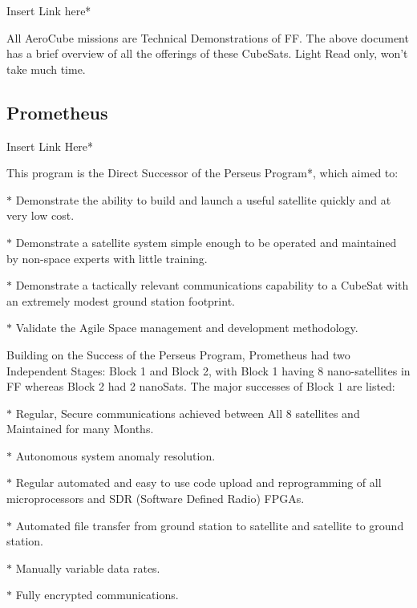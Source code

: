 \documentclass[12pt, a4paper, oneside]{book}
\newenvironment{section-points}{\begin{adjustwidth}{2cm}{2cm}}{\end{adjustwidth}}
\begin{document}
Insert Link here*

\vspace{0.3cm}

All AeroCube missions are Technical Demonstrations of FF. The above document has a brief overview of all the offerings of these CubeSats. Light Read only, won't take much time.

\subsection{Prometheus}

\vspace{0cm}

Insert Link Here*

\vspace{0.3cm}

This program is the Direct Successor of the Perseus Program*, which aimed to:

\vspace{-0.5cm}

\begin{section-points}
	\item[$\ast$] Demonstrate the ability to build and launch a useful satellite quickly and at very low cost.
	\item[$\ast$] Demonstrate a satellite system simple enough to be operated and maintained by non-space experts with little training.
	\item[$\ast$] Demonstrate a tactically relevant communications capability to a CubeSat with an extremely modest ground station footprint.
	\item[$\ast$] Validate the Agile Space management and development methodology.
\end{section-points}

\vspace{0.3cm}

Building on the Success of the Perseus Program, Prometheus had two Independent Stages: Block 1 and Block 2, with Block 1 having 8 nano-satellites in FF whereas Block 2 had 2 nanoSats. The major successes of Block 1 are listed:

\vspace{-0.5cm}

\begin{section-points}
	\item[$\ast$] Regular, Secure communications achieved between All 8 satellites and Maintained for many Months.
	\item[$\ast$] Autonomous system anomaly resolution.
	\item[$\ast$] Regular automated and easy to use code upload and reprogramming of all microprocessors and SDR (Software Defined Radio) FPGAs.
	\item[$\ast$] Automated file transfer from ground station to satellite and satellite to ground station.
	\item[$\ast$] Manually variable data rates.
	\item[$\ast$] Fully encrypted communications.
\end{section-points}
\end{document}
